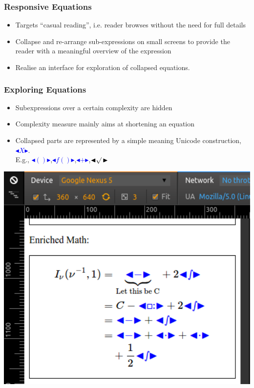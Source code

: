 \documentclass{beamer}
\begin{document}
\begin{frame}
  \frametitle{Responsive Equations}
  \begin{itemize}
  \item Targets ``casual reading'', i.e. reader browses without the need for
    full details
  \item Collapse and re-arrange sub-expressions on small screens to provide the
    reader with a meaningful overview of the expression 
  \item Realise an interface for exploration of collapsed equations.
  \end{itemize}
\end{frame}

\def\collapse#1{\textcolor{blue}{\ensuremath{\mathord{\blacktriangleleft}\mathord{#1}
\mathord{\blacktriangleright}}}}

\begin{frame}
  \frametitle{Exploring Equations}
  \begin{minipage}{.49\linewidth}
    \begin{itemize}
    \item Subexpressions over a certain complexity are hidden
    \item Complexity measure mainly aims at shortening an equation
    \item Collapsed parts are represented by a simple meaning Unicode
      construction, \collapse{X}.\\
      E.g., \collapse{()},\collapse{f()},\collapse{+},\collapse{\raise2pt\hbox{$\sqrt{}$}\,}
    \end{itemize}
  \end{minipage}
  \begin{minipage}{.49\linewidth}
   \includegraphics[width=1\textwidth]{./ex_long_collapse.png}
 \end{minipage}
 
\end{frame}
\end{document}
